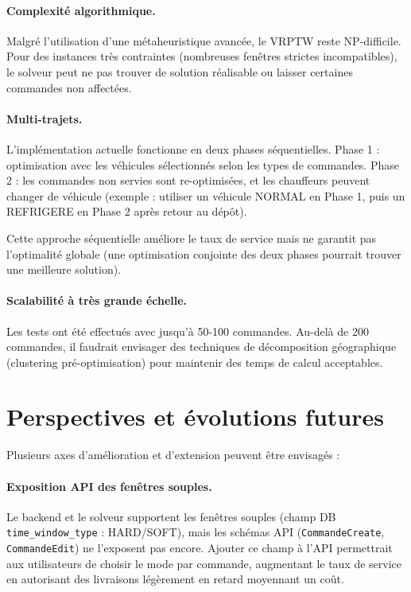 \documentclass[12pt,a4paper]{report}
\begin{document}
\paragraph{Complexité algorithmique.} Malgré l'utilisation d'une métaheuristique avancée, le VRPTW reste NP-difficile. Pour des instances très contraintes (nombreuses fenêtres strictes incompatibles), le solveur peut ne pas trouver de solution réalisable ou laisser certaines commandes non affectées.

\paragraph{Multi-trajets.} L'implémentation actuelle fonctionne en deux phases séquentielles. Phase 1 : optimisation avec les véhicules sélectionnés selon les types de commandes. Phase 2 : les commandes non servies sont re-optimisées, et les chauffeurs peuvent changer de véhicule (exemple : utiliser un véhicule NORMAL en Phase 1, puis un REFRIGERE en Phase 2 après retour au dépôt).

Cette approche séquentielle améliore le taux de service mais ne garantit pas l'optimalité globale (une optimisation conjointe des deux phases pourrait trouver une meilleure solution).

\paragraph{Scalabilité à très grande échelle.} Les tests ont été effectués avec jusqu'à 50-100 commandes. Au-delà de 200 commandes, il faudrait envisager des techniques de décomposition géographique (clustering pré-optimisation) pour maintenir des temps de calcul acceptables.

\section*{Perspectives et évolutions futures}

Plusieurs axes d'amélioration et d'extension peuvent être envisagés :

\paragraph{Exposition API des fenêtres souples.} Le backend et le solveur supportent les fenêtres souples (champ DB \texttt{time\_window\_type} : HARD/SOFT), mais les schémas API (\texttt{CommandeCreate}, \texttt{CommandeEdit}) ne l'exposent pas encore. Ajouter ce champ à l'API permettrait aux utilisateurs de choisir le mode par commande, augmentant le taux de service en autorisant des livraisons légèrement en retard moyennant un coût.
\end{document}
